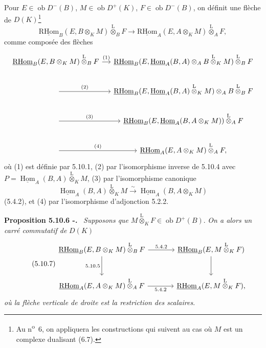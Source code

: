 \documentclass[11pt]{article}
\newenvironment{statement}[1]{\par\medskip\noindent\textbf{#1.}\ }{\par\medskip}
\DeclareMathOperator{\Hom}{Hom}
\newcommand{\R}{\mathrm{R}}\newcommand{\RHomCore}{\mathrm{RHom}}
\newcommand{\ob}{\operatorname{ob}}
\providecommand{\RHom}{\RHomCore}
\providecommand{\uRHom}{\underline{\RHom}}
\providecommand{\uHom}{\underline{\Hom}}
\providecommand{\lten}{\overset{\mathrm L}{\otimes}}
\providecommand{\RHom}{\RHomCore}
\providecommand{\Hom}{\operatorname{Hom}}
\providecommand{\ob}{\operatorname{ob}}
\providecommand{\lten}{\overset{\mathrm L}{\otimes}}
\providecommand{\RHom}{\R\mathcal{H}om}
\providecommand{\lten}{\overset{\mathrm L}{\otimes}}
\providecommand{\R}{\mathrm R}
\providecommand{\lten}{\overset{\mathrm L}{\otimes}}
\providecommand{\lten}{\overset{\mathrm L}{\otimes}}
\providecommand{\lten}{\overset{\mathrm L}{\otimes}}
\providecommand{\RHom}{\RHomCore}
\providecommand{\Hom}{\operatorname{Hom}}
\providecommand{\lten}{\overset{\mathrm L}{\otimes}}
\begin{document}
Pour $E\in\ob D^-(B)$, $M\in\ob D^+(K)$, $F\in\ob D^-(B)$, on définit une flèche de $D(K)$\footnote{Au n\textsuperscript{o}~6, on appliquera les constructions qui suivent au cas où $M$ est un complexe dualisant (6.7).}
\begin{equation}\tag{5.10.5}
\uRHom_B(E,B\otimes_KM)\lten_BF\longrightarrow\uRHom_A(E,A\otimes_KM)\lten_AF,
\end{equation}
comme composée des flèches
\[
\begin{tikzcd}[column sep=small]
\uRHom_B(E,B\otimes_KM)\lten_BF \arrow[r,"(1)"] & \uRHom_B(E,\uHom_A(B,A)\otimes_AB\lten_KM)\lten_BF \\
\arrow[r,"(2)"] & \uRHom_B(E,\uHom_A(B,A)\lten_KM)\otimes_A B\lten_BF \\
\arrow[r,"(3)"] & \uRHom_B(E,\uHom_A(B,A\otimes_KM))\lten_AF \\
\arrow[r,"(4)"] & \uRHom_A(E,A\otimes_KM)\lten_AF,
\end{tikzcd}
\]
où (1) est définie par 5.10.1, (2) par l'isomorphisme inverse de 5.10.4 avec $P=\uHom_A(B,A)\lten_KM$, (3) par l'isomorphisme canonique
\[
\uHom_A(B,A)\lten_KM\xrightarrow{\sim}\uHom_A(B,A\otimes_KM)
\]
(5.4.2), et (4) par l'isomorphisme d'adjonction 5.2.2.

\begin{statement}{Proposition 5.10.6 -}
\emph{Supposons que} $M\lten_KF\in\ob D^+(B)$. \emph{On a alors un carré commutatif de} $D(K)$
\begin{equation}\tag{5.10.7}
\begin{tikzcd}[column sep=large,row sep=large]
\uRHom_B(E,B\otimes_KM)\lten_BF \arrow[r,"5.4.2"] \arrow[d,"5.10.5"'] & \uRHom_B(E,M\lten_KF) \arrow[d]\\
\uRHom_A(E,A\otimes_KM)\lten_AF \arrow[r,"5.4.2"'] & \uRHom_A(E,M\lten_KF),
\end{tikzcd}
\end{equation}
\emph{où la flèche verticale de droite est la restriction des scalaires}.
\end{statement}
\end{document}
